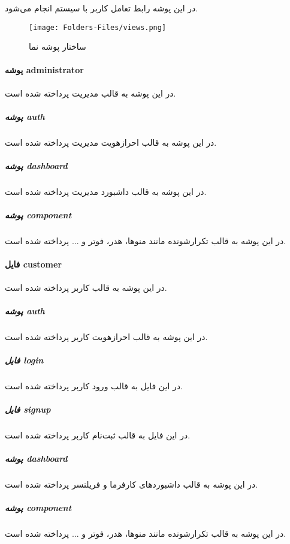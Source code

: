 در این پوشه رابط تعامل کاربر با سیستم انجام می‌شود.

\begin{figure}[H]
	\texttt{[image: Folders-Files/views.png]}
	\centering
	\caption{ساختار پوشه نما}
	\label{fig:folder-views}
\end{figure}


\paragraph{پوشه administrator}
در این پوشه به قالب مدیریت پرداخته شده است.

\subparagraph{پوشه auth}
در این پوشه به قالب احرازهویت مدیریت پرداخته شده است.

\subparagraph{پوشه dashboard}
در این پوشه به قالب داشبورد مدیریت پرداخته شده است.

\subparagraph{پوشه component}
در این پوشه به قالب تکرارشونده مانند منوها، هدر، فوتر و ... پرداخته شده است.


\paragraph{فایل customer}
در این پوشه به قالب کاربر پرداخته شده است.

\subparagraph{پوشه auth}
در این پوشه به قالب احرازهویت کاربر پرداخته شده است.

\subparagraph{فایل login}
در این فایل به قالب ورود کاربر پرداخته شده است.

\subparagraph{فایل signup}
در این فایل به قالب ثبت‌نام کاربر پرداخته شده است.

\subparagraph{پوشه dashboard}
در این پوشه به قالب داشبوردهای کارفرما و فریلنسر پرداخته شده است.

\subparagraph{پوشه component}
در این پوشه به قالب تکرارشونده مانند منوها، هدر، فوتر و ... پرداخته شده است.